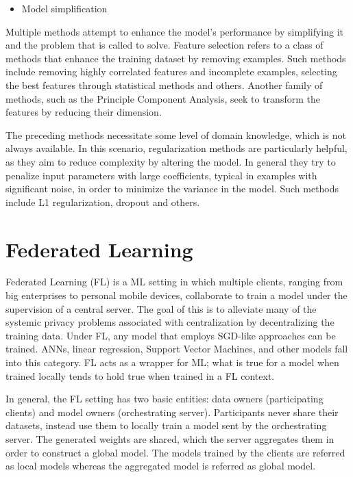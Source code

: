 \begin{itemize}[resume]
    \item Model simplification
\end{itemize}
Multiple methods attempt to enhance the model's performance by simplifying it and the problem that is called to solve. Feature selection refers to a class of methods that enhance the training dataset by removing examples. Such methods include removing highly correlated features and incomplete examples, selecting the best features through statistical methods and others. Another family of methods, such as the Principle Component Analysis, seek to transform the features by reducing their dimension.

The preceding methods necessitate some level of domain knowledge, which is not always available. In this scenario, regularization methods are particularly helpful, as they aim to reduce complexity by altering the model. In general they try to penalize input parameters with large coefficients, typical in examples with significant noise, in order to minimize the variance in the model. Such methods include L1 regularization, dropout and others.

\section{Federated Learning}
Federated Learning \cite{FL-original-paper, FL_comprehensive_survey} (FL) is a ML setting in which multiple clients, ranging from big enterprises to personal mobile devices, collaborate to train a model under the supervision of a central server. The goal of this is to alleviate many of the systemic privacy problems associated with centralization by decentralizing the training data. Under FL, any model that employs SGD-like approaches can be trained. ANNs, linear regression, Support Vector Machines, and other models fall into this category. FL acts as a wrapper for ML; what is true for a model when trained locally tends to hold true when trained in a FL context.

In general, the FL setting has two basic entities: data owners (participating clients) and model owners (orchestrating server). Participants never share their datasets, instead use them to locally train a model sent by the orchestrating server. The generated weights are shared, which the server aggregates them in order to construct a global model. The models trained by the clients are referred as local models whereas the aggregated model is referred as global model.

